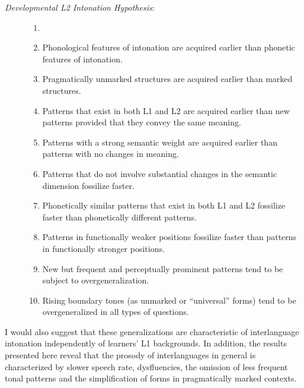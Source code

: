 \begin{description}
\item[\textit{Developmental L2 Intonation Hypothesis}:]
\begin{enumerate}[label=(\arabic*)]
\item[]
\item Phonological features of intonation are acquired earlier than phonetic features of intonation.
\item Pragmatically unmarked structures are acquired earlier than marked structures.
\item Patterns that exist in both L1 and L2 are acquired earlier than new patterns provided that they convey the same meaning.
\item Patterns with a strong semantic weight are acquired earlier than patterns with no changes in meaning.
\item Patterns that do not involve substantial changes in the semantic dimension fossilize faster.
\item Phonetically similar patterns that exist in both L1 and L2 fossilize faster than phonetically different patterns.
\item Patterns in functionally weaker positions fossilize faster than patterns in functionally stronger positions.
\item New but frequent and perceptually prominent patterns tend to be subject to overgeneralization.
\item Rising boundary tones (as unmarked or “universal” forms) tend to be overgeneralized in all types of questions.
\end{enumerate}
\end{description}

I would also suggest that these generalizations are characteristic of interlanguage intonation independently of learners’ L1 backgrounds. In addition, the results presented here reveal that the prosody of interlanguages in general is characterized by slower speech rate, dysfluencies, the omission of less frequent tonal patterns and the simplification of forms in pragmatically marked contexts.
